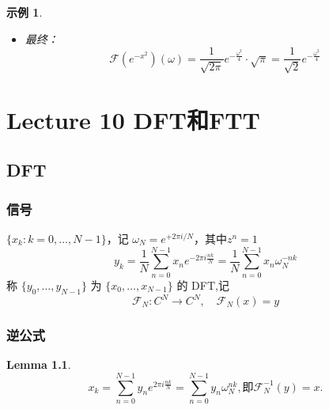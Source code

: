 \documentclass[linespread=1.5,openany]{book}%
\def\C{C}%
\theoremstyle{plain}
\newtheorem{lemma}[theorem]{Lemma}
\newtheorem{example}[theorem]{示例}
\newcommand{\C}{\mathbb{C}}                %
\begin{document}
{{\begin{example}
\begin{itemize}
						\item[(v)] 最终：
						\[
						\mathcal{F}(e^{-x^{2}})(\omega) = \frac{1}{\sqrt{2\pi}}e^{-\frac{\omega^{2}}{4}} \cdot \sqrt{\pi} = \frac{1}{\sqrt{2}}e^{-\frac{\omega^{2}}{4}}
						\]
					\end{itemize}
				\end{example}
				
			}
		
			\part{Lecture 10 DFT和FTT}{
				\chapter{DFT}{
					\section{信号}
					$\{x_k: k=0,\dots,N-1\}$，记 $\omega_N = e^{+2\pi i / N}$，其中$z^n=1$
					\begin{equation}
						y_k = \frac{1}{N} \sum_{n=0}^{N-1} x_n e^{-2\pi i \frac{nk}{N}} = \frac{1}{N} \sum_{n=0}^{N-1} x_n \omega_N^{-nk}
					\end{equation}
					称 $\{y_0,\dots,y_{N-1}\}$ 为 $\{x_0,\dots,x_{N-1}\}$ 的 DFT,记 \[\mathcal{F}_N: \C^N \rightarrow \C^N,\quad \mathcal{F}_N(x) = y\]\begin{center}
					\end{center}
					\section{ 逆公式}
					\begin{lemma}
						\begin{equation}
							x_k = \sum_{n=0}^{N-1} y_n e^{2\pi i \frac{nk}{N}} = \sum_{n=0}^{N-1} y_n \omega_N^{nk}, \text{即} \mathcal{F}_N^{-1}(y) = x.
						\end{equation}
					\end{lemma}
					
}}}
\end{document}
